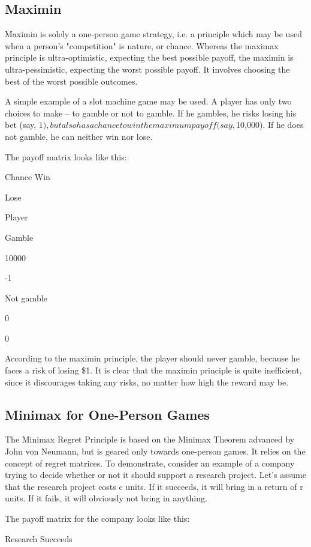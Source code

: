 \documentclass[]{report}
\begin{document}
\subsection{Maximin}

Maximin is solely a one-person game strategy, i.e. a principle which may be used when a person's "competition" is nature, or chance. Whereas the maximax principle is ultra-optimistic, expecting the best possible payoff, the maximin is ultra-pessimistic, expecting the worst possible payoff. It involves choosing the best of the worst possible outcomes.

A simple example of a slot machine game may be used. A player has only two choices to make -- to gamble or not to gamble. If he gambles, he risks losing his bet (say, $1), but also has a chance to win the maximum payoff (say, $10,000). If he does not gamble, he can neither win nor lose.

The payoff matrix looks like this:

Chance
Win

Lose

Player 

Gamble

10000

-1

Not gamble

0

0


According to the maximin principle, the player should never gamble, because he faces a risk of losing \$1. It is clear that the maximin principle is quite inefficient, since it discourages taking any risks, no matter how high the reward may be.


\subsection{Minimax for One-Person Games}

The Minimax Regret Principle is based on the Minimax Theorem advanced by John von Neumann, but is geared only towards one-person games. It relies on the concept of regret matrices. To demonstrate, consider an example of a company trying to decide whether or not it should support a research project. Let's assume that the research project costs c units. If it succeeds, it will bring in a return of r units. If it fails, it will obviously not bring in anything.

The payoff matrix for the company looks like this:

Research
Succeeds
\end{document}
